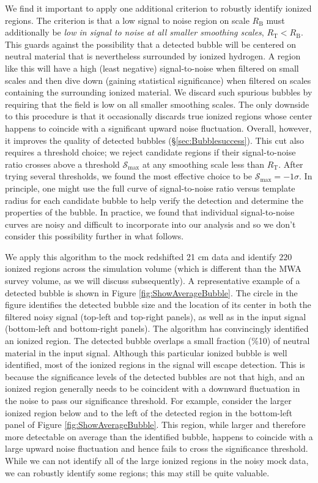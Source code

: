 We find it important to apply one additional criterion to robustly
identify ionized regions. The criterion is that a low signal to noise
region on scale $R_{\text{B}}$ must additionally be {\em low in signal to noise at all smaller smoothing scales},
$R_{\text{T}} < R_{\text{B}}$. This guards against the possibility that a detected
bubble will be centered on neutral material that is nevertheless surrounded by ionized hydrogen. A
region like this will have a high (least negative) signal-to-noise when filtered on small scales
and then dive down (gaining statistical significance) when filtered on scales containing
the surrounding ionized material. We discard such spurious bubbles by requiring
that the field is low on all smaller smoothing scales. The only downside to this
procedure is that it occasionally discards true ionized regions whose center
happens to coincide with a significant upward noise fluctuation. Overall, however, it improves the quality of detected
bubbles (\S \ref{sec:Bubblesuccess}). This cut also requires a threshold choice; we
reject candidate regions if their signal-to-noise ratio crosses above a threshold $\mathcal{S}_{\max}$
at any smoothing scale less than $R_{\text{T}}$.
After trying several
thresholds, we found the most effective choice to be $\mathcal{S}_{\max} = -1\sigma$. In principle, one might use the full curve of signal-to-noise ratio
versus template radius for each candidate bubble to help verify the detection and
determine the properties of the bubble. In practice, we found that individual
signal-to-noise curves are noisy and difficult to incorporate into our analysis and
so we don't consider this possibility further in what follows.

We apply this algorithm to the mock redshifted 21 cm data and
identify $220$ ionized regions across the simulation volume (which is different
than the MWA survey volume, as we will discuss subsequently). A representative
example of a detected bubble is shown in Figure \ref{fig:ShowAverageBubble}. The
circle in the figure identifies the detected bubble size and the location
of its center in both the filtered noisy signal (top-left and top-right panels),
as well as in the input signal (bottom-left and bottom-right panels). The
algorithm has convincingly identified an ionized region. The detected bubble overlaps
a small fraction (\%10) of neutral material in the input signal. Although this particular
ionized bubble is well identified, most of the ionized regions in the signal will
escape detection. This is because the significance levels of the detected bubbles are not that 
high, and an ionized region generally needs to be coincident
with a downward fluctuation in the noise to pass our significance threshold. 
For example, consider the larger ionized region below and to the left of the
detected region in the bottom-left panel of Figure \ref{fig:ShowAverageBubble}.
This region, while larger and therefore more detectable on average than the identified bubble,
happens to coincide with a large upward noise fluctuation and hence fails to cross
the significance threshold. While we can not identify all of the large
ionized regions in the noisy mock data, we can robustly identify some regions; this may still
be quite valuable.

